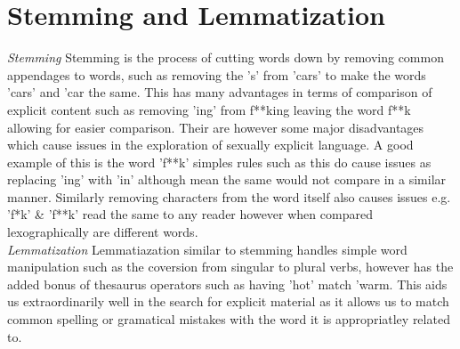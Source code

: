 \documentclass{report}
\begin{document}
\section*{Stemming and Lemmatization}
\emph{Stemming}
Stemming is the process of cutting words down by removing common appendages to words, such as removing the 's' from 'cars' to make the words 'cars' and 'car the same. This has many advantages in terms of comparison of explicit content such as removing 'ing' from f**king leaving the word f**k allowing for easier comparison. Their are however some major disadvantages which cause issues in the exploration of sexually explicit language. A good example of this is the word 'f**k' simples rules such as this do cause issues as replacing 'ing' with 'in' although mean the same would not compare in a similar manner. Similarly removing characters from the word itself also causes issues e.g. 'f*k' & 'f**k' read the same to any reader however when compared lexographically are different words.
\\
\emph{Lemmatization}
Lemmatiazation similar to stemming handles simple word manipulation such as the coversion from singular to plural verbs, however has the added bonus of thesaurus operators such as having 'hot' match 'warm. This aids us extraordinarily well in the search for explicit material as it allows us to match common spelling or gramatical mistakes with the word it is appropriatley related to. 
\end{document}
